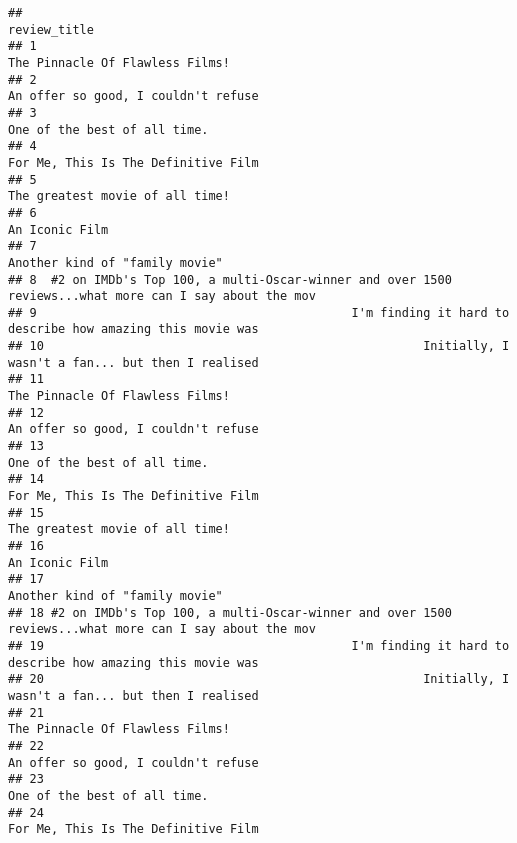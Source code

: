 \documentclass[
]{article}
\begin{document}
\begin{verbatim}
##                                                                                            review_title
## 1                                                                       The Pinnacle Of Flawless Films!
## 2                                                                   An offer so good, I couldn't refuse
## 3                                                                          One of the best of all time.
## 4                                                                   For Me, This Is The Definitive Film
## 5                                                                       The greatest movie of all time!
## 6                                                                                        An Iconic Film
## 7                                                                        Another kind of "family movie"
## 8  #2 on IMDb's Top 100, a multi-Oscar-winner and over 1500 reviews...what more can I say about the mov
## 9                                            I'm finding it hard to describe how amazing this movie was
## 10                                                     Initially, I wasn't a fan... but then I realised
## 11                                                                      The Pinnacle Of Flawless Films!
## 12                                                                  An offer so good, I couldn't refuse
## 13                                                                         One of the best of all time.
## 14                                                                  For Me, This Is The Definitive Film
## 15                                                                      The greatest movie of all time!
## 16                                                                                       An Iconic Film
## 17                                                                       Another kind of "family movie"
## 18 #2 on IMDb's Top 100, a multi-Oscar-winner and over 1500 reviews...what more can I say about the mov
## 19                                           I'm finding it hard to describe how amazing this movie was
## 20                                                     Initially, I wasn't a fan... but then I realised
## 21                                                                      The Pinnacle Of Flawless Films!
## 22                                                                  An offer so good, I couldn't refuse
## 23                                                                         One of the best of all time.
## 24                                                                  For Me, This Is The Definitive Film

\end{verbatim}
\end{document}
